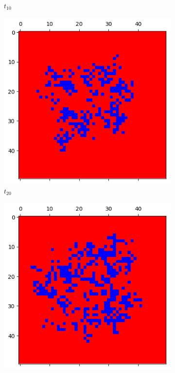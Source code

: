 \documentclass[letterpaper]{article}
\begin{document}
\begin{figure}[H]
\begin{subfigure}{.33\textwidth}
      \caption{$t_{10}$}
    \end{subfigure}
    \begin{subfigure}{.33\textwidth}
      \centering
      \includegraphics[width=1\linewidth]{images/assign2/part32-defect/t20}
      \caption{$t_{20}$}
    \end{subfigure}
    \begin{subfigure}{.33\textwidth}
      \centering
      \includegraphics[width=1\linewidth]{images/assign2/part32-defect/t40}

\end{subfigure}
\end{figure}
\end{document}
